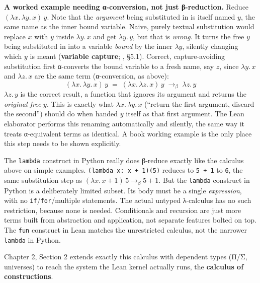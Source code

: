 \textbf{A worked example needing α-conversion, not just β-reduction.} Reduce \((\lambda x.\, \lambda y.\, x)\, y\). Note that the \emph{argument} being substituted in is itself named \(y\), the same name as the inner bound variable. Naive, purely textual substitution would replace \(x\) with \(y\) inside \(\lambda y.\, x\) and get \(\lambda y.\, y\), but that is \emph{wrong}. It turns the free \(y\) being substituted in into a variable \emph{bound} by the inner \(\lambda y\), silently changing which \(y\) is meant (\textbf{variable capture}; \cite{Pierce2002}, §5.1). Correct, capture-avoiding substitution first α-converts the bound variable to a fresh name, say \(z\), since \(\lambda y.\, x\) and \(\lambda z.\, x\) are the same term (α-conversion, as above): \[
(\lambda x.\, \lambda y.\, x)\, y
\;=\; (\lambda x.\, \lambda z.\, x)\, y
\;\longrightarrow_\beta\; \lambda z.\, y
\] \(\lambda z.\, y\) is the correct result, a function that ignores its argument and returns the \emph{original free} \(y\). This is exactly what \(\lambda x.\, \lambda y.\, x\) (``return the first argument, discard the second'') should do when handed \(y\) itself as that first argument. The Lean elaborator performs this renaming automatically and silently, the same way it treats α-equivalent terms as identical. A book working example is the only place this step needs to be shown explicitly.

\begin{progcorner}

The \texttt{lambda} construct in Python really does β-reduce exactly like the calculus above on simple examples. \texttt{(lambda x: x + 1)(5)} reduces to \texttt{5 + 1} to \texttt{6}, the same substitution step as \((\lambda x.\, x + 1)\, 5 \to_\beta 5 + 1\). But the \texttt{lambda} construct in Python is a deliberately limited subset. Its body must be a single \emph{expression}, with no \texttt{if}/\texttt{for}/multiple statements. The actual untyped λ-calculus has no such restriction, because none is needed. Conditionals and recursion are just more terms built from abstraction and application, not separate features bolted on top. The \texttt{fun} construct in Lean matches the unrestricted calculus, not the narrower \texttt{lambda} in Python.

\end{progcorner}

Chapter 2, Section 2 extends exactly this calculus with dependent types (Π/Σ, universes) to reach the system the Lean kernel actually runs, the \textbf{calculus of constructions}.

